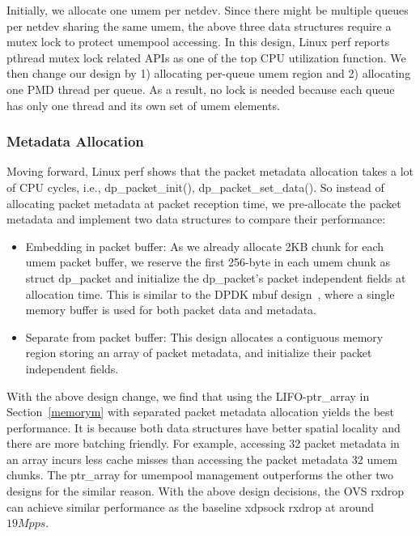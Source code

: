 \documentclass[10pt]{sigplanconf}
\begin{document}
Initially, we allocate one umem per netdev. Since there might be multiple
queues per netdev sharing the same umem, the above three data structures
require a mutex lock to protect umempool accessing. In this design, Linux
perf reports pthread mutex lock related APIs as one of the top CPU
utilization function.
We then change our design by 1) allocating per-queue umem region and 2)
allocating one PMD thread per queue. As a result, no lock is needed because
each queue has only one thread and its own set of umem elements.

\subsubsection{Metadata Allocation}
Moving forward, Linux perf shows that the packet metadata allocation
takes a lot of CPU cycles, i.e.,  dp\_packet\_init(), dp\_packet\_set\_data().
So instead of allocating packet metadata at packet reception time, we pre-allocate
the packet metadata and implement two data structures to compare their performance:
\begin{itemize}
\item Embedding in packet buffer: As we already allocate 2KB chunk for each
umem packet buffer, we reserve the first 256-byte in each umem chunk as struct dp\_packet
and initialize the dp\_packet's packet independent fields  at allocation time.
This is similar to the DPDK mbuf design~\cite{dpdkmbuf}, where a single memory buffer
is used for both packet data and metadata.
\item Separate from packet buffer: This design allocates a contiguous memory
region storing an array of packet metadata, and initialize their packet
independent fields.
\end{itemize}


With the above design change, we find that using the LIFO-ptr\_array in
Section~\ref{memorym} with separated packet metadata allocation yields the
best performance. It is because both data structures have better spatial
locality and there are more batching friendly.
For example, accessing 32 packet metadata in an array incurs less cache
misses than accessing the packet metadata 32 umem chunks.
The ptr\_array for umempool management outperforms the other two designs
for the similar reason. With the above design decisions, the OVS rxdrop
can achieve similar performance as the baseline xdpsock rxdrop at around
$19Mpps$.
\end{document}
